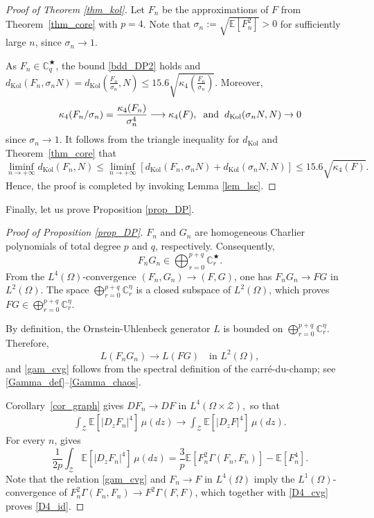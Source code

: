 \documentclass[ECP,preprint]{ejpecp}
\newcommand{\E}{\mathbb{E}}
\newcommand{\cZ}{\mathcal{Z}}
\newcommand{\bC}{\mathbb{C}^\eta}
\newcommand{\fin}{\mathbb{C}^{\bigstar}}
\newcommand{\AND}{\hspace{2mm}{\rm and}\hspace{2mm}}
\newcommand{\dK}{d_{\mathrm{Kol}}}
\newcommand{\s}{\sigma}
\begin{document}
 \begin{proof}[Proof of Theorem \ref{thm_kol}]
Let $F_n$ be the approximations of $F$ from
Theorem~\ref{thm_core} with $p=4$. 
Note that $\s_n := \sqrt{\E[ F_n^2]} > 0$ for sufficiently large $n$, 
 since $\s_n\to 1$.

 As $F_n\in\fin_q$, the bound \eqref{bdd_DP2}
 holds and 
 $
 \dK(F_n, \s_n N) = \dK( \frac{F_n}{\s_n},  N) \leq 15.6 \sqrt{\kappa_4(  \frac{F_n}{\s_n} )}.
 $
 Moreover,
 \[
 \kappa_4(F_n/\s_n)
 =
 \frac{\kappa_4(F_n)}{\s_n^4}
 \longrightarrow
 \kappa_4(F),
\AND
 \dK(\s_nN,N)\to0
 \]
 since $\s_n\to1$.
 It follows from the triangle inequality for $\dK$ and Theorem~\ref{thm_core}
 that 
 \[
 \liminf_{n\to+\infty} \dK(F_n, N) \leq 
  \liminf_{n\to+\infty} [\dK(F_n, \s_n N) +  \dK( \s_n N, N ) ] \leq 
 15.6 \sqrt{\kappa_4( F )}.
 \]
 Hence, the proof is completed by invoking Lemma \ref{lem_lsc}.
 \end{proof}

 
 

Finally, let us prove  Proposition \ref{prop_DP}.

\begin{proof}[Proof of Proposition \ref{prop_DP}]
 $F_n$ and $G_n$ are  homogeneous Charlier
polynomials of total degree $p$ and $q$, respectively.
Consequently,
\[
  F_nG_n\in  \bigoplus_{r=0}^{p+q}\fin_r.
\]
From the  $L^4(\Omega)$-convergence $(F_n, G_n)\to (F,G)$, 
one has $F_nG_n\to FG$ in $L^2(\Omega)$.  The  space $ \bigoplus_{r=0}^{p+q}\bC_r$
is a closed subspace of $L^2(\Omega)$, which proves 
$FG\in \bigoplus_{r=0}^{p+q}\bC_r.$

 By definition,  the Ornstein-Uhlenbeck generator $L$
is bounded on $ \bigoplus_{r=0}^{p+q}\bC_r$.  Therefore,
\[
  L(F_nG_n)\longrightarrow L(FG)
  \quad\text{in }L^2(\Omega),
\]
and \eqref{gam_cvg} follows from the spectral definition of the
carr\'e-du-champ; see \eqref{Gamma_def}--\eqref{Gamma_chaos}.

Corollary~\ref{cor_graph} gives
$DF_n\longrightarrow DF$
in   $L^4(\Omega\times \cZ),$
so that
\begin{align}
  \int_\cZ\E[|D_zF_n|^4] \,\mu(dz)
  \longrightarrow
  \int_\cZ\E[|D_zF|^4] \,\mu(dz).
  \label{D4_cvg}
\end{align}
For every $n$, \cite[Lemma~3.2]{DP18} gives
\[
  \frac1{2p}
  \int_\cZ\E[|D_zF_n|^4] \,\mu(dz)
  =\frac{3}{p}\E[F_n^2\Gamma(F_n,F_n)]-\E[F_n^4].
\]
Note that the relation  \eqref{gam_cvg} and $F_n\to F$ in $L^4(\Omega)$
imply the $L^1(\Omega)$-convergence of 
$  F_n^2\Gamma(F_n,F_n)
\to F^2\Gamma(F,F)$,
which together 
 with \eqref{D4_cvg} proves
\eqref{D4_id}.
\qedhere





\end{proof}
  
\end{document}
